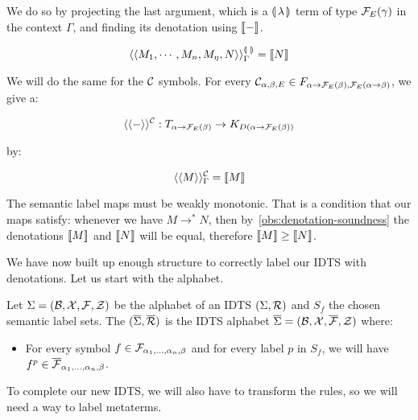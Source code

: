 We do so by projecting the last argument, which is a $\llparenthesis \, \lambda \, \rrparenthesis$
term of type $\mathcal{F}_E(\gamma)$ in the context $\Gamma$, and finding its
denotation using $\llbracket - \rrbracket$.

$$
\langle\langle M_1, \cdots, M_n, M_\eta, N\rangle\rangle^{\llparenthesis \,  \, \rrparenthesis}_\Gamma = \llbracket N \rrbracket
$$

We will do the same for the $\mathcal{C}$ symbols. For every
$\mathcal{C}_{\alpha,\beta,E} \in F_{\alpha \to \mathcal{F}_E(\beta),\mathcal{F}_E(\alpha \to
  \beta)}$, we give a:

$$
\langle\langle-\rangle\rangle^{\mathcal{C}} : T_{\alpha \to \mathcal{F}_E(\beta)} \to K_{D(\alpha \to \mathcal{F}_E(\beta))}
$$

by:

$$
\langle\langle M\rangle\rangle^{\mathcal{C}}_\Gamma = \llbracket M \rrbracket
$$

The semantic label maps must be weakly monotonic. That is a condition that
our maps satisfy: whenever we have $M \to^* N$, then
by~\ref{obs:denotation-soundness} the denotations $\llbracket M \rrbracket$ and $\llbracket N \rrbracket$
will be equal, therefore $\llbracket M \rrbracket \ge \llbracket N \rrbracket$.

We have now built up enough structure to correctly label our IDTS with
denotations. Let us start with the alphabet.

\begin{definition}
  Let $\Sigma = (\mathcal{B}, \mathcal{X}, \mathcal{F}, \mathcal{Z})$ be the alphabet of an IDTS
  $(\Sigma, \mathcal{R})$ and $S_f$ the chosen semantic label sets. The
  $(\overline{\Sigma}, \overline{\mathcal{R}})$ is the IDTS alphabet
  $\overline{\Sigma} = (\mathcal{B}, \mathcal{X}, \overline{\mathcal{F}}, \mathcal{Z})$ where:

  \begin{itemize}
  \item For every symbol $f \in \mathcal{F}_{\alpha_1,\ldots,\alpha_n,\beta}$ and
    for every label $p$ in $S_f$, we will have
    $f^p \in \overline{\mathcal{F}}_{\alpha_1,\ldots,\alpha_n,\beta}$.
  \end{itemize}
\end{definition}

To complete our new IDTS, we will also have to transform the rules, so we
will need a way to label metaterms.

